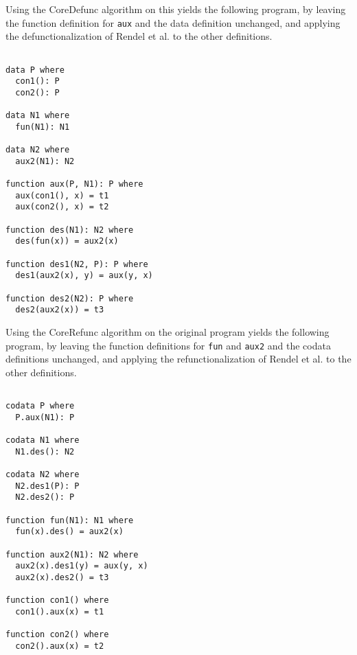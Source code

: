 Using the \textsf{CoreDefunc} algorithm on this yields the following program, by leaving the function definition for \texttt{aux} and the data definition unchanged, and applying the defunctionalization of Rendel et al. to the other definitions.

\begin{lstlisting}

data P where
  con1(): P
  con2(): P

data N1 where
  fun(N1): N1

data N2 where
  aux2(N1): N2

function aux(P, N1): P where
  aux(con1(), x) = t1
  aux(con2(), x) = t2

function des(N1): N2 where
  des(fun(x)) = aux2(x)

function des1(N2, P): P where
  des1(aux2(x), y) = aux(y, x)

function des2(N2): P where
  des2(aux2(x)) = t3

\end{lstlisting}

Using the \textsf{CoreRefunc} algorithm on the original program yields the following program, by leaving the function definitions for \texttt{fun} and \texttt{aux2} and the codata definitions unchanged, and applying the refunctionalization of Rendel et al. to the other definitions.

\begin{lstlisting}

codata P where
  P.aux(N1): P

codata N1 where
  N1.des(): N2

codata N2 where
  N2.des1(P): P
  N2.des2(): P

function fun(N1): N1 where
  fun(x).des() = aux2(x)

function aux2(N1): N2 where
  aux2(x).des1(y) = aux(y, x)
  aux2(x).des2() = t3

function con1() where
  con1().aux(x) = t1

function con2() where
  con2().aux(x) = t2

\end{lstlisting}

